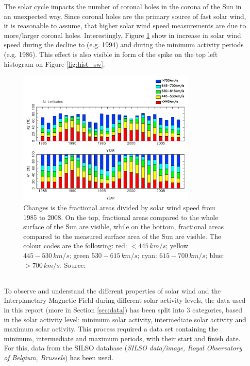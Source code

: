 \documentclass[12pt]{article}
\begin{document}
        The solar cycle impacts the number of coronal holes in the corona of the Sun in an unexpected way. Since coronal holes are the primary source of fast solar wind, it is reasonable to assume, that higher solar wind speed measurements are due to more/larger coronal holes. Interestingly, Figure \ref{fig:sw_speeds} show in increase in solar wind speed during the decline to (e.g. 1994) and during the minimum activity periods (e.g. 1986)\cite{2010tokumaru}. This effect is also visible in form of the spike on the top left histogram on Figure \ref{fig:hist_sw}.\\
        \begin{figure}[t!]
            \centering
            \includegraphics[width=0.8\textwidth]{fig_theory/sw_speed_distribution.PNG}
            \caption{Changes is the fractional areas divided by solar wind speed from 1985 to 2008. On the top, fractional areas compared to the whole surface of the Sun are visible, while on the bottom, fractional areas compared to the measured surface area of the Sun are visible. The colour codes are the following: red: $<445\,km/s$; yellow $445-530\,km/s$; green $530-615\,km/s$; cyan: $615-700\,km/s$; blue: $>700\,km/s$. Source: \cite{2010tokumaru}}
            \label{fig:sw_speeds}
        \end{figure}\\
        To observe and understand the different properties of solar wind and the Interplanetary Magnetic Field during different solar activity levels, the data used in this report (more in Section \ref{sec:data}) has been split into 3 categories, based in the solar activity level: minimum solar activity, intermediate solar activity and maximum solar activity. This process required a data set containing the minimum, intermediate and maximum periods, with their start and finish date. For this, data from the SILSO database (\textit{SILSO data/image, Royal Observatory of Belgium, Brussels}) has been used.\\ \\
\end{document}
